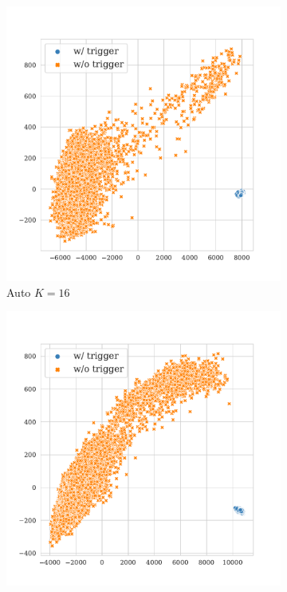 \begin{figure}[!ht]
\begin{subfigure}{.33\textwidth}
  \centering
  \includegraphics[width=\linewidth]{figures/evaluation_media/mnli-mismatched-roberta-large-visual-backdoor-auto-k16-seed42-candidates10-poison-cf-1115.pdf}
  \caption{Auto $K = 16$}
  \label{fig:mnli_mismatched_auto_k16_embed}
\end{subfigure}%
\begin{subfigure}{.33\textwidth}
  \centering
  \includegraphics[width=\linewidth]{figures/evaluation_media/mnli-mismatched-roberta-large-visual-backdoor-auto-k100-seed42-candidates10-poison-cf-1149.pdf}

\end{subfigure}
\end{figure}

